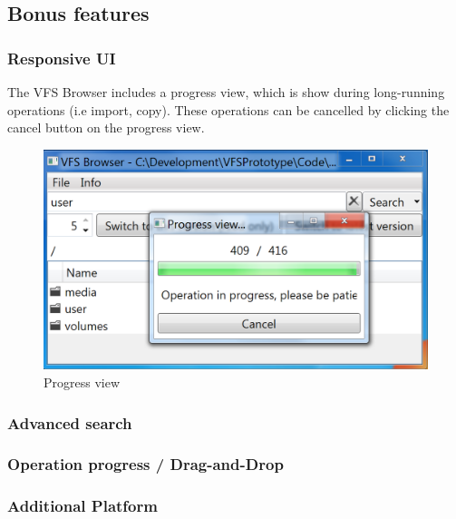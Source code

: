 \documentclass[a4paper,12pt]{article}
\begin{document}
\subsection{Bonus features}
\subsubsection{Responsive UI}
The VFS Browser includes a progress view, which is show during long-running operations (i.e import, copy). These operations can be cancelled by clicking the cancel button on the progress view.
\begin{figure}[h!]
  \centering
  \includegraphics[scale=0.35]{Images/progress.png} 
  \caption{Progress view}
\end{figure}

\subsubsection{Advanced search}

\subsubsection{Operation progress / Drag-and-Drop}

\subsubsection{Additional Platform}
\end{document}
